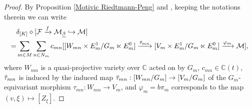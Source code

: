 \documentclass[12pt]{amsart}
\theoremstyle{definition}
\numberwithin{equation}{section}
\begin{document}
\begin{proof}
    By Proposition \ref{Motivic Riedtmann-Peng} and \cite[Corollary 5.16]{Joyce07}, keeping the notations therein we can write
    \begin{align*}
    &\delta_{[K]} \diamond [\mathcal{F} \xrightarrow{f} \mathcal{M}_{\underline{\beta}} \hookrightarrow \mathcal{M} ] \\
    =& \sum_{m \in M}\sum_{n \in N_m}c_{mn}[[W_{mn} \times E_m^1/G_m \ltimes E_m^0] \xrightarrow{\Tilde{\tau}_{mn}}[V_m \times E_m^1/G_m \ltimes E_m^0] \xrightarrow{\varphi_m }\mathcal{M}],
    \end{align*}
    where $ W_{mn} $ is a quasi-projective variety over $ \mathbb{C} $ acted on by $ G_m $, $ c_{mn} \in \mathbb{C}(t) $, $ \Tilde{\tau}_{mn} $ is induced by the induced map $ \Bar{\tau}_{mn}: [W_{mn}/G_m] \to [V_m/G_m] $ of the $ G_m $-equivariant morphism $ \tau_{mn}: W_{mn} \to V_m $, and $ \varphi_m = b \pi_m  $ corresponds to the map $ (v,\xi) \mapsto [Z_{\xi}] $.


\end{proof}
\end{document}
